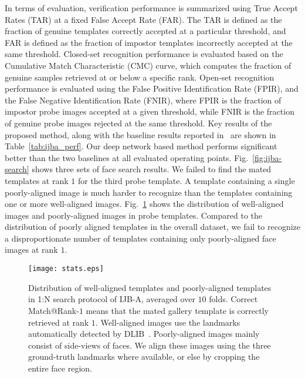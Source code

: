 \documentclass[10pt,journal,compsoc]{IEEEtran}
\begin{document}
In terms of evaluation, verification performance is summarized using True Accept Rates (TAR) at a fixed False Accept Rate (FAR). The TAR is defined as the fraction of genuine templates correctly accepted at a particular threshold, and FAR is defined as the fraction of impostor templates incorrectly accepted at the same threshold. Closed-set recognition performance is evaluated based on the Cumulative Match Characteristic (CMC) curve, which computes the fraction of genuine samples retrieved at or below a specific rank. Open-set recognition performance is evaluated using the False Positive Identification Rate (FPIR), and the False Negative Identification Rate (FNIR), where FPIR is the fraction of impostor probe images accepted at a given threshold, while FNIR is the fraction of genuine probe images rejected at the same threshold. Key results of the proposed method, along with the baseline results reported in~\cite{db:janus} are shown in Table~\ref{tab:ijba_perf}. Our deep network based method performs significant better than the two baselines at all evaluated operating points. Fig.~\ref{fig:ijba-search} shows three sets of face search results. We failed to find the mated templates at rank $1$ for the third probe template. A template containing a single poorly-aligned image is much harder to recognize than the templates containing one or more well-aligned images. Fig.~\ref{fig:stats} shows the distribution of well-aligned images and poorly-aligned images in probe templates. Compared to the distribution of poorly aligned templates in the overall dataset, we fail to recognize a disproportionate number of templates containing only poorly-aligned face images at rank $1$.

\begin{figure}
\centering
  \texttt{[image: stats.eps]}\\
  \caption{Distribution of well-aligned templates and poorly-aligned templates in 1:N search protocol of IJB-A, averaged over $10$ folds. Correct Match@Rank-$1$ means that the mated gallery template is correctly retrieved at rank $1$. Well-aligned images use the landmarks automatically detected by DLIB~\cite{kazemi2014one}. Poorly-aligned images mainly consist of side-views of faces. We align these images using the three ground-truth landmarks where available, or else by cropping the entire face region. }\label{fig:stats}
\end{figure}
\end{document}
